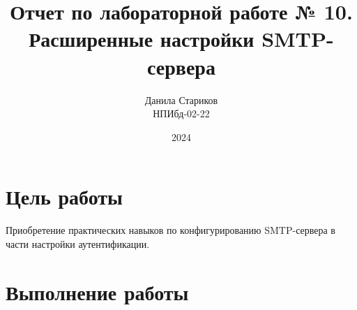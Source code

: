 

\title{Отчет по лабораторной работе № 10. \\Расширенные настройки SMTP-сервера}
\author{Данила Стариков \\ НПИбд-02-22}
\date{2024}



\maketitle
\newpage

\tableofcontents

\newpage
\section{Цель работы}
Приобретение практических навыков по конфигурированию SMTP-сервера в части настройки аутентификации.
\newpage
\section{Выполнение работы}


